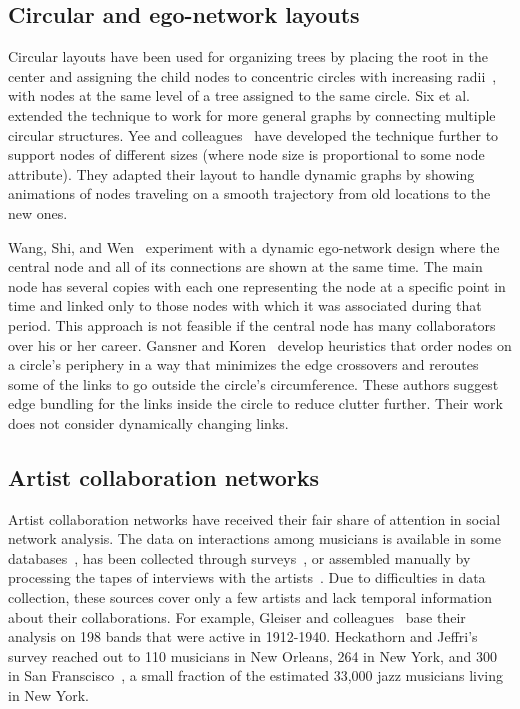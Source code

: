 \documentclass[12pt]{cmuthesis}
\begin{document}

  \subsection{Circular and ego-network layouts}

  Circular layouts have been used for organizing trees by placing the root in the center and assigning the child nodes to concentric circles with increasing radii~\cite{North1997}, with nodes at the same level of a tree assigned to the same circle. Six et al.~\cite{Six1999} extended the technique to work for more general graphs by connecting multiple circular structures. Yee and colleagues~\cite{Yee2001} have developed the technique further to support nodes of different sizes (where node size is proportional to some node attribute). They adapted their layout to handle dynamic graphs by showing animations of nodes traveling on a smooth trajectory from old locations to the new ones.

  Wang, Shi, and Wen~\cite{Wang2011a} experiment with a dynamic ego-network design where the central node and all of its connections are shown at the same time. The main node has several copies with each one representing the node at a specific point in time and linked only to those nodes with which it was associated during that period. This approach is not feasible if the central node has many collaborators over his or her career. Gansner and Koren~\cite{Gansner2006} develop heuristics that order nodes on a circle's periphery in a way that minimizes the edge crossovers and reroutes some of the links to go outside the circle's circumference. These authors suggest edge bundling for the links inside the circle to reduce clutter further. Their work does not consider dynamically changing links.

  \subsection{Artist collaboration networks}

  Artist collaboration networks have received their fair share of attention in social network analysis. The data on interactions among musicians is available in some databases~\cite{Gleiser2003,Pattuelli2012}, has been collected through surveys~\cite{Heckathorn2001a}, or assembled manually by processing the tapes of interviews with the artists~\cite{Pattuelli2011}. Due to difficulties in data collection, these sources cover only a few artists and lack temporal information about their collaborations. For example, Gleiser and colleagues~\cite{Gleiser2003} base their analysis on 198 bands that were active in 1912-1940. Heckathorn and Jeffri's survey reached out to 110 musicians in New Orleans, 264 in New York, and 300 in San Franscisco~\cite{Heckathorn2001a}, a small fraction of the estimated 33,000 jazz musicians living in New York.
\end{document}
